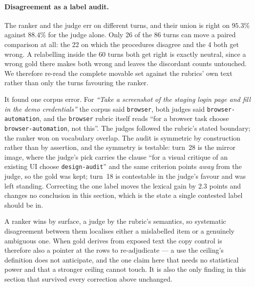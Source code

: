 \paragraph{Disagreement as a label audit.} The ranker and the judge err on different turns, and their union is right on $95.3\%$ against $88.4\%$ for the judge alone. Only 26 of the 86 turns can move a paired comparison at all: the 22 on which the procedures disagree and the 4 both get wrong. A relabelling inside the 60 turns both get right is exactly neutral, since a wrong gold there makes both wrong and leaves the discordant counts untouched. We therefore re-read the complete movable set against the rubrics' own text rather than only the turns favouring the ranker.

It found one corpus error. For \emph{``Take a screenshot of the staging login page and fill in the demo credentials''} the corpus said \texttt{browser}, both judges said \texttt{browser-automation}, and the \texttt{browser} rubric itself reads ``for a browser task choose \texttt{browser-automation}, not this''. The judges followed the rubric's stated boundary; the ranker won on vocabulary overlap. The audit is symmetric by construction rather than by assertion, and the symmetry is testable: turn~28 is the mirror image, where the judge's pick carries the clause ``for a visual critique of an existing UI choose \texttt{design-audit}'' and the same criterion points \emph{away} from the judge, so the gold was kept; turn~18 is contestable in the judge's favour and was left standing. Correcting the one label moves the lexical gain by $2.3$ points and changes no conclusion in this section, which is the state a single contested label should be in.

A ranker wins by surface, a judge by the rubric's semantics, so systematic disagreement between them localises either a mislabelled item or a genuinely ambiguous one. When gold derives from exposed text the copy control is therefore also a pointer at the rows to re-adjudicate --- a use the ceiling's definition does not anticipate, and the one claim here that needs no statistical power and that a stronger ceiling cannot touch. It is also the only finding in this section that survived every correction above unchanged.

